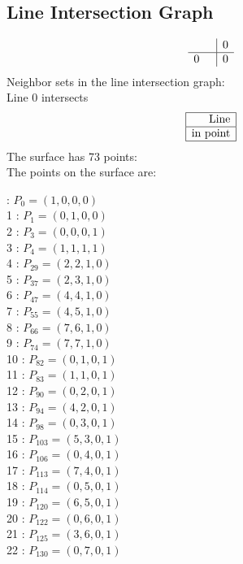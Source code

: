\documentclass{article}
\begin{document}
{\subsection*{Line Intersection Graph}
{\arraycolsep=1pt
$$
\begin{array}{rr|*{1}r}
 &  & 0\\
\hline
0 &  & 0\\
\end{array}
$$
}%
Neighbor sets in the line intersection graph:\\
Line 0 intersects 
$$
\begin{array}{|r*{0}{|c}|}
\hline
\mbox{Line} \\
\hline
\mbox{in point} \\
\hline
\end{array}
$$
The surface has 73 points:\\
The points on the surface are:\\
\begin{multicols}{3}
 : $P_{0}=( 1, 0, 0, 0 )$\\
1 : $P_{1}=( 0, 1, 0, 0 )$\\
2 : $P_{3}=( 0, 0, 0, 1 )$\\
3 : $P_{4}=( 1, 1, 1, 1 )$\\
4 : $P_{29}=( 2, 2, 1, 0 )$\\
5 : $P_{37}=( 2, 3, 1, 0 )$\\
6 : $P_{47}=( 4, 4, 1, 0 )$\\
7 : $P_{55}=( 4, 5, 1, 0 )$\\
8 : $P_{66}=( 7, 6, 1, 0 )$\\
9 : $P_{74}=( 7, 7, 1, 0 )$\\
10 : $P_{82}=( 0, 1, 0, 1 )$\\
11 : $P_{83}=( 1, 1, 0, 1 )$\\
12 : $P_{90}=( 0, 2, 0, 1 )$\\
13 : $P_{94}=( 4, 2, 0, 1 )$\\
14 : $P_{98}=( 0, 3, 0, 1 )$\\
15 : $P_{103}=( 5, 3, 0, 1 )$\\
16 : $P_{106}=( 0, 4, 0, 1 )$\\
17 : $P_{113}=( 7, 4, 0, 1 )$\\
18 : $P_{114}=( 0, 5, 0, 1 )$\\
19 : $P_{120}=( 6, 5, 0, 1 )$\\
20 : $P_{122}=( 0, 6, 0, 1 )$\\
21 : $P_{125}=( 3, 6, 0, 1 )$\\
22 : $P_{130}=( 0, 7, 0, 1 )$\\

\end{multicols}}
\end{document}
